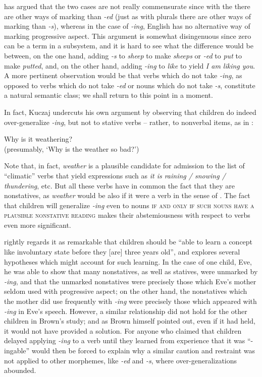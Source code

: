 \citet{Kuczaj1978} has argued that the two cases are not really commensurate since with the  there are other ways of mark\-ing than \textit{-ed} (just as with plurals there are other ways of marking than \textit{-s}), whereas in the case of \textit{-ing}, English has no alternative way of marking progressive aspect. This argument is somewhat disingenuous since zero can be a term in a subsystem, and it is hard to see what the difference would be between, on the one hand, adding \textit{-s} to \textit{sheep} to make \textit{sheeps} or \textit{-ed} to \textit{put} to make \textit{putted}, and, on the other hand, adding \textit{-ing} to \textit{like} to yield \textit{I am liking you}. A more pertinent observa\-tion would be that verbs which do not take \textit{-ing}, as opposed to verbs which do not take \textit{-ed} or nouns which do not take \textit{-s}, constitute a natural semantic class; we shall return to this point in a moment.

In fact, Kuczaj undercuts his own argument by observing that children do indeed over-generalize \textit{-ing}, but not to stative verbs -- rather, to nonverbal items, as in :

\ea\label{ex:3:15}
 Why is it weathering?\\
\glt (presumably, `Why is the weather so bad?')
\z

\noindent Note that, in fact, \textit{weather} is a plausible candidate for admission to the list of ``climatic'' verbs that yield expressions such as \textit{it is raining / snowing / thundering}, etc. But all these verbs have in common the fact that they are nonstatives, as \textit{weather} would be also if it were a verb in the sense of . The fact that children will generalize \textit{-ing} even to nouns \textsc{if and only if such nouns have a plausible nonstative reading} makes their abstemiousness with respect to  verbs even more significant.

\citet[326ff]{Brown1973} rightly regards it as remarkable that chil\-dren should be ``able to learn a concept like involuntary state before they [are] three years old'', and explores several hypotheses which might account for such learning. In the case of one child, Eve, he was able to show that many nonstatives, as well as statives, were unmarked by \textit{-ing}, and that the unmarked nonstatives were precisely those which Eve's mother seldom used with progressive aspect; on the other hand, the nonstatives which the mother did use frequently with \textit{-ing} were precisely those which appeared with \textit{-ing} in Eve's speech. However, a similar relationship did not hold for the other children in Brown's study; and as Brown himself pointed out, even if it had held, it would not have provided a solution. For anyone who claimed that children delayed applying \textit{-ing} to a verb until they learned from experience that it was ``-ingable'' would then be forced to explain why a similar caution and restraint was not applied to other morphemes, like \textit{-ed} and \textit{-s}, where over-generalizations abounded.

